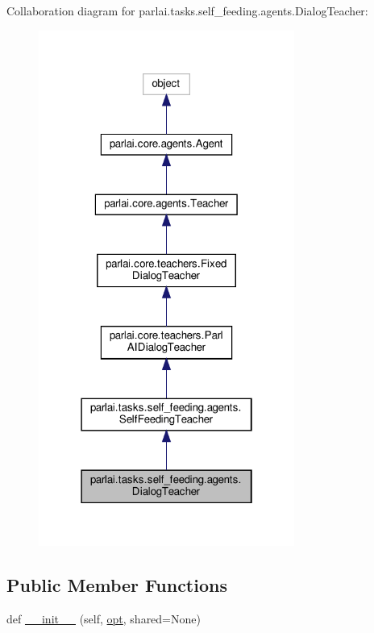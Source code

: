 Collaboration diagram for parlai.\+tasks.\+self\+\_\+feeding.\+agents.\+Dialog\+Teacher\+:
\nopagebreak
\begin{figure}[H]
\begin{center}
\leavevmode
\includegraphics[width=238pt]{d2/d58/classparlai_1_1tasks_1_1self__feeding_1_1agents_1_1DialogTeacher__coll__graph}
\end{center}
\end{figure}
\subsection*{Public Member Functions}
\begin{DoxyCompactItemize}
\item 
def \hyperlink{classparlai_1_1tasks_1_1self__feeding_1_1agents_1_1DialogTeacher_a4d54bccea69db40c88a1a9c83b0bad78}{\+\_\+\+\_\+init\+\_\+\+\_\+} (self, \hyperlink{classparlai_1_1core_1_1agents_1_1Teacher_a3ce6243860ce978a897922863ed32fa4}{opt}, shared=None)
\end{DoxyCompactItemize}
